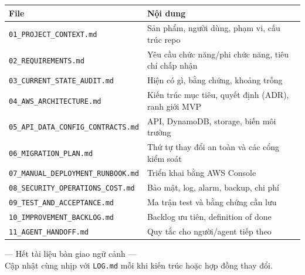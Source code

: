 \documentclass[11pt,a4paper]{article}
\newcommand{\code}[1]{\texttt{#1}}
\begin{document}
\begin{longtable}{@{}p{6.4cm} p{8.4cm}@{}}
\toprule
\textbf{File} & \textbf{Nội dung} \\
\midrule
\endhead
\code{01_PROJECT_CONTEXT.md} & Sản phẩm, người dùng, phạm vi, cấu trúc repo \\
\code{02_REQUIREMENTS.md} & Yêu cầu chức năng/phi chức năng, tiêu chí chấp nhận \\
\code{03_CURRENT_STATE_AUDIT.md} & Hiện có gì, bằng chứng, khoảng trống \\
\code{04_AWS_ARCHITECTURE.md} & Kiến trúc mục tiêu, quyết định (ADR), ranh giới MVP \\
\code{05_API_DATA_CONFIG_CONTRACTS.md} & API, DynamoDB, storage, biến môi trường \\
\code{06_MIGRATION_PLAN.md} & Thứ tự thay đổi an toàn và các cổng kiểm soát \\
\code{07_MANUAL_DEPLOYMENT_RUNBOOK.md} & Triển khai bằng AWS Console \\
\code{08_SECURITY_OPERATIONS_COST.md} & Bảo mật, log, alarm, backup, chi phí \\
\code{09_TEST_AND_ACCEPTANCE.md} & Ma trận test và bằng chứng cần lưu \\
\code{10_IMPROVEMENT_BACKLOG.md} & Backlog ưu tiên, definition of done \\
\code{11_AGENT_HANDOFF.md} & Quy tắc cho người/agent tiếp theo \\
\bottomrule
\end{longtable}

\vspace{0.6cm}
\begin{center}
\color{muted}\small
--- Hết tài liệu bàn giao ngữ cảnh ---\\
Cập nhật cùng nhịp với \code{LOG.md} mỗi khi kiến trúc hoặc hợp đồng thay đổi.
\end{center}
\end{document}
